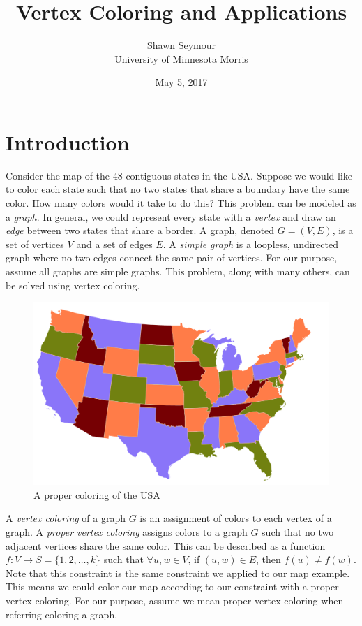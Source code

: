 \documentclass{article}
\title{Vertex Coloring and Applications}
\date{May 5, 2017}
\author{Shawn Seymour\\ University of Minnesota Morris}
\theoremstyle{definition}
\begin{document}
\maketitle

\setlength{\parskip}{0.3cm}

\section{Introduction}
Consider the map of the 48 contiguous states in the USA. Suppose we would like to color each state such that no two states that share a boundary have the same color. How many colors would it take to do this? This problem can be modeled as a \emph{graph}. In general, we could represent every state with a \emph{vertex} and draw an \emph{edge} between two states that share a border. A graph, denoted $G = (V, E)$, is a set of vertices $V$ and a set of edges $E$. A \emph{simple graph} is a loopless, undirected graph where no two edges connect the same pair of vertices. For our purpose, assume all graphs are simple graphs. This problem, along with many others, can be solved using vertex coloring.

\begin{figure}[H]
\centering
\includegraphics[width=0.7\linewidth]{figures/map-colors.pdf}
\caption{A proper coloring of the USA}\label{fig:map}
\end{figure}

A \emph{vertex coloring} of a graph $G$ is an assignment of colors to each vertex of a graph. A \emph{proper vertex coloring} assigns colors to a graph $G$ such that no two adjacent vertices share the same color. This can be described as a function $f : V \rightarrow S = \{1, 2, \ldots, k\}$ such that $\forall u,w \in V$, if $(u,w) \in E$, then $f(u) \neq f(w)$. Note that this constraint is the same constraint we applied to our map example. This means we could color our map according to our constraint with a proper vertex coloring. For our purpose, assume we mean proper vertex coloring when referring coloring a graph.
\end{document}

